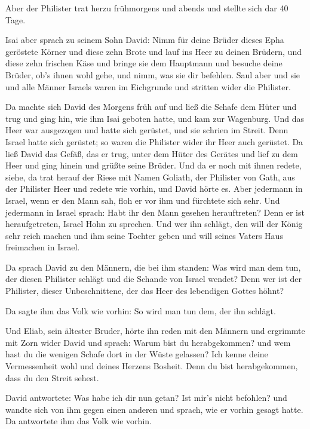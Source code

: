  Aber der Philister trat herzu frühmorgens und abends und
stellte sich dar 40 Tage.

 Isai aber sprach zu seinem Sohn David: Nimm für deine
Brüder dieses Epha geröstete Körner und diese zehn Brote und lauf ins
Heer zu deinen Brüdern,  und diese zehn frischen Käse und
bringe sie dem Hauptmann und besuche deine Brüder, ob's ihnen wohl gehe,
und nimm, was sie dir befehlen.  Saul aber und sie und
alle Männer Israels waren im Eichgrunde und stritten wider die
Philister.

 Da machte sich David des Morgens früh auf und ließ die
Schafe dem Hüter und trug und ging hin, wie ihm Isai geboten hatte, und
kam zur Wagenburg. Und das Heer war ausgezogen und hatte sich gerüstet,
und sie schrien im Streit.  Denn Israel hatte sich
gerüstet; so waren die Philister wider ihr Heer auch gerüstet.
 Da ließ David das Gefäß, das er trug, unter dem Hüter
des Gerätes und lief zu dem Heer und ging hinein und grüßte seine
Brüder.  Und da er noch mit ihnen redete, siehe, da trat
herauf der Riese mit Namen Goliath, der Philister von Gath, aus der
Philister Heer und redete wie vorhin, und David hörte es.
 Aber jedermann in Israel, wenn er den Mann sah, floh er
vor ihm und fürchtete sich sehr.  Und jedermann in Israel
sprach: Habt ihr den Mann gesehen herauftreten? Denn er ist
heraufgetreten, Israel Hohn zu sprechen. Und wer ihn schlägt, den will
der König sehr reich machen und ihm seine Tochter geben und will seines
Vaters Haus freimachen in Israel.

 Da sprach David zu den Männern, die bei ihm standen: Was
wird man dem tun, der diesen Philister schlägt und die Schande von
Israel wendet? Denn wer ist der Philister, dieser Unbeschnittene, der
das Heer des lebendigen Gottes höhnt?

 Da sagte ihm das Volk wie vorhin: So wird man tun dem,
der ihn schlägt.

 Und Eliab, sein ältester Bruder, hörte ihn reden mit den
Männern und ergrimmte mit Zorn wider David und sprach: Warum bist du
herabgekommen? und wem hast du die wenigen Schafe dort in der Wüste
gelassen? Ich kenne deine Vermessenheit wohl und deines Herzens Bosheit.
Denn du bist herabgekommen, dass du den Streit sehest.

 David antwortete: Was habe ich dir nun getan? Ist mir's
nicht befohlen?  und wandte sich von ihm gegen einen
anderen und sprach, wie er vorhin gesagt hatte. Da antwortete ihm das
Volk wie vorhin.

